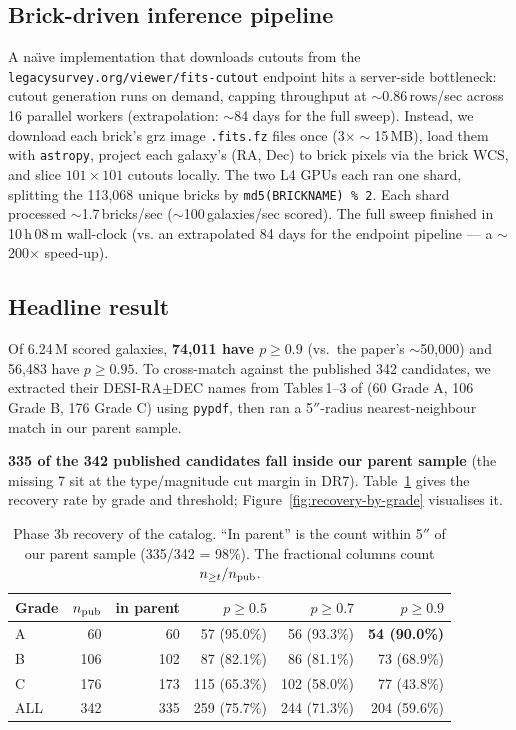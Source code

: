 \documentclass[11pt,letterpaper]{article}
\begin{document}
\subsection{Brick-driven inference pipeline}
A na\"\i ve implementation that downloads cutouts from the
\verb|legacysurvey.org/viewer/fits-cutout| endpoint hits a
server-side bottleneck: cutout generation runs on demand, capping
throughput at $\sim$0.86\,rows/sec across 16 parallel workers
(extrapolation: $\sim$84 days for the full sweep). Instead, we
download each brick's grz image \verb|.fits.fz| files once
($3 \times \sim$15\,MB), load them with \verb|astropy|, project each
galaxy's (RA, Dec) to brick pixels via the brick WCS, and slice
$101\times 101$ cutouts locally. The two L4 GPUs each ran one shard,
splitting the 113{,}068 unique bricks by \verb|md5(BRICKNAME) % 2|.
Each shard processed $\sim$1.7\,bricks/sec ($\sim$100\,galaxies/sec
scored). The full sweep finished in 10\,h\,08\,m wall-clock (vs. an
extrapolated 84 days for the endpoint pipeline — a $\sim$\,200$\times$
speed-up).

\subsection{Headline result}
Of 6.24\,M scored galaxies, \textbf{74{,}011 have $p \geq 0.9$}
(vs.\ the paper's $\sim$50{,}000) and 56{,}483 have $p \geq 0.95$. To
cross-match against the published 342 candidates, we extracted their
DESI-RA$\pm$DEC names from Tables\,1--3 of \textcite{huang2020decals}
(60 Grade A, 106 Grade B, 176 Grade C) using \verb|pypdf|, then ran
a 5$''$-radius nearest-neighbour match in our parent sample.

\textbf{335 of the 342 published candidates fall inside our parent
sample} (the missing 7 sit at the type/magnitude cut margin in DR7).
Table~\ref{tab:phase3b-recovery} gives the recovery rate by grade and
threshold; Figure~\ref{fig:recovery-by-grade} visualises it.

\begin{table}[ht]
\centering
\caption{Phase 3b recovery of the \textcite{huang2020decals} catalog.
``In parent'' is the count within 5$''$ of our parent sample
(335/342 = 98\%). The fractional columns count $n_{\geq t}/n_{\rm pub}$.}
\label{tab:phase3b-recovery}
\begin{tabular}{lrrrrr}
\toprule
Grade & $n_{\rm pub}$ & in parent & $p \geq 0.5$ & $p \geq 0.7$ & $p \geq 0.9$ \\
\midrule
A   &  60 &  60 &  57 (95.0\%) &  56 (93.3\%) & \textbf{54 (90.0\%)} \\
B   & 106 & 102 &  87 (82.1\%) &  86 (81.1\%) &  73 (68.9\%) \\
C   & 176 & 173 & 115 (65.3\%) & 102 (58.0\%) &  77 (43.8\%) \\
\midrule
ALL & 342 & 335 & 259 (75.7\%) & 244 (71.3\%) & 204 (59.6\%) \\
\bottomrule
\end{tabular}
\end{table}
\end{document}
